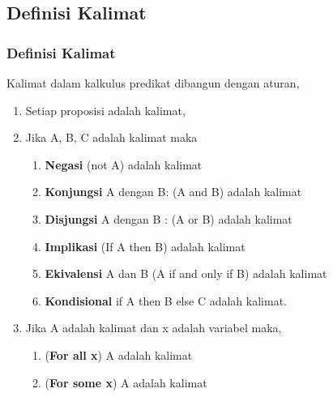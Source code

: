\documentclass[handout]{beamer}
\theoremstyle{definition}
\theoremstyle{example}
\begin{document}
\subsection{Definisi Kalimat}
\begin{frame}
	\frametitle{Definisi Kalimat}
      Kalimat dalam kalkulus predikat dibangun dengan aturan,\\
		\begin{enumerate} 
			\item  Setiap proposisi adalah kalimat,
		    \item  Jika A, B, C adalah kalimat maka
		          \begin{enumerate} 
			         \item \textbf{Negasi} (not A) adalah kalimat
					 \item \textbf{Konjungsi} A dengan B: (A and B) adalah kalimat
			         \item \textbf{Disjungsi} A dengan B : (A or B) adalah kalimat
			         \item \textbf{Implikasi} (If A then B) adalah kalimat
			         \item \textbf{Ekivalensi} A dan B (A if and only if B) adalah kalimat
			         \item \textbf{Kondisional} if A then B else C adalah kalimat.
			     \end{enumerate}   
		    \item  Jika A adalah kalimat dan x adalah variabel maka,
		          \begin{enumerate} 
		          	\item (\textbf{For all x}) A adalah kalimat
		          	\item (\textbf{For some x}) A adalah kalimat
		         \end{enumerate} 	
	    \end{enumerate}
\end{frame}
\end{document}
